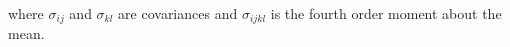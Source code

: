 \noindent where
$\sigma_{ij}$
and
$\sigma_{kl}$ are covariances
and
$\sigma_{ijkl}$
is the fourth order moment about the mean.